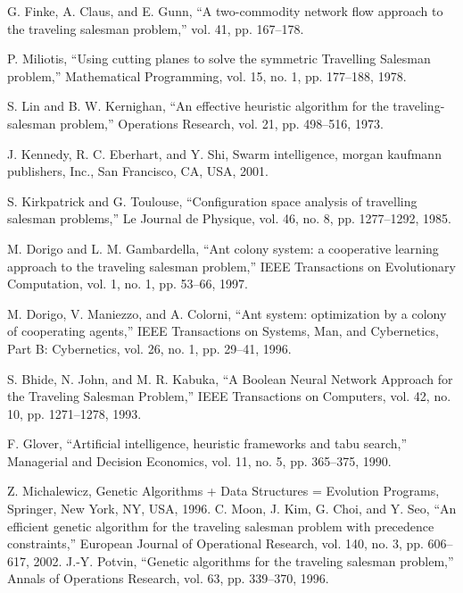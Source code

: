 \documentclass[11pt]{article}
\begin{document}
\begin{thebibliography}{10}


G. Finke, A. Claus, and E. Gunn, “A two-commodity network
flow approach to the traveling salesman problem,” vol. 41, pp.
167–178.

P. Miliotis, “Using cutting planes to solve the symmetric
Travelling Salesman problem,” Mathematical Programming, vol.
15, no. 1, pp. 177–188, 1978.

S. Lin and B. W. Kernighan, “An effective heuristic algorithm
for the traveling-salesman problem,” Operations Research, vol.
21, pp. 498–516, 1973.

 J. Kennedy, R. C. Eberhart, and Y. Shi, Swarm intelligence,
morgan kaufmann publishers, Inc., San Francisco, CA, USA,
2001.

S. Kirkpatrick and G. Toulouse, “Configuration space analysis of
travelling salesman problems,” Le Journal de Physique, vol. 46,
no. 8, pp. 1277–1292, 1985.

 M. Dorigo and L. M. Gambardella, “Ant colony system: a cooperative learning approach to the traveling salesman problem,”
IEEE Transactions on Evolutionary Computation, vol. 1, no. 1, pp.
53–66, 1997.

 M. Dorigo, V. Maniezzo, and A. Colorni, “Ant system: optimization by a colony of cooperating agents,” IEEE Transactions on
Systems, Man, and Cybernetics, Part B: Cybernetics, vol. 26, no.
1, pp. 29–41, 1996.

 S. Bhide, N. John, and M. R. Kabuka, “A Boolean Neural
Network Approach for the Traveling Salesman Problem,” IEEE
Transactions on Computers, vol. 42, no. 10, pp. 1271–1278, 1993.

F. Glover, “Artificial intelligence, heuristic frameworks and tabu
search,” Managerial and Decision Economics, vol. 11, no. 5, pp.
365–375, 1990.

Z. Michalewicz, Genetic Algorithms + Data Structures = Evolution Programs, Springer, New York, NY, USA, 1996.
C. Moon, J. Kim, G. Choi, and Y. Seo, “An efficient genetic
algorithm for the traveling salesman problem with precedence
constraints,” European Journal of Operational Research, vol. 140,
no. 3, pp. 606–617, 2002.
 J.-Y. Potvin, “Genetic algorithms for the traveling salesman
problem,” Annals of Operations Research, vol. 63, pp. 339–370,
1996.


\end{thebibliography}
\end{document}
